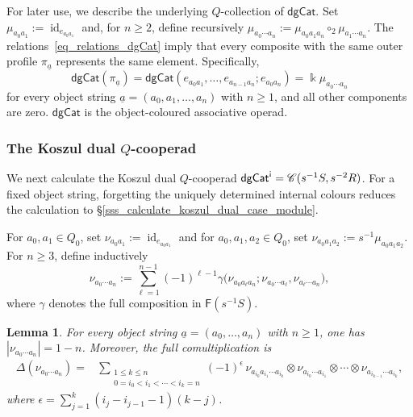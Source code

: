 \documentclass[11pt,letterpaper]{article}
\numberwithin{equation}{section}
\theoremstyle{plain}
\newtheorem{lem}[thm]{Lemma}
\theoremstyle{definition}
\theoremstyle{remark}
\newcommand{\antishriek}{%
	\mathord{\mathchoice
		{\rotatebox[origin=c]{180}{$\displaystyle !$}}
		{\rotatebox[origin=c]{180}{$\textstyle !$}}
		{\rotatebox[origin=c]{180}{$\scriptstyle !$}}
		{\rotatebox[origin=c]{180}{$\scriptscriptstyle !$}}}}
\newcommand{\id}{\operatorname{id}}
\begin{document}
	For later use, we describe the underlying $Q$-collection of
	$\mathsf{dgCat}$. Set
	$\mu_{a_0a_1}:=\id_{e_{a_0a_1}}$
	and, for $n\geq2$, define recursively
	$\mu_{a_0\cdots a_n}:=\mu_{a_0a_1a_n}\circ_2\mu_{a_1\cdots a_n}$.
	The relations~\eqref{eq_relations_dgCat} imply that every composite with the same outer profile $\pi_{\underline a}$ represents the same
	element. Specifically,
	\begin{equation*}
		\mathsf{dgCat}(\pi_{\underline a}) = 	\mathsf{dgCat}(e_{a_0a_1},\dots, e_{a_{n-1}a_n}; e_{a_0a_n})
		=
		\Bbbk\mu_{a_0\cdots a_n}
	\end{equation*}
	for every object string $\underline a=(a_0, a_1,\dots, a_n)$ with $n\geq1$,
	and all other components are zero. $\mathsf{dgCat}$ is the object-coloured associative operad.

	\subsubsection{The Koszul dual $Q$-cooperad}

	We next calculate the Koszul dual $Q$-cooperad
	$\mathsf{dgCat}^{\antishriek} =\mathscr C(s^{-1}S,s^{-2}R)$.
	For a fixed object string, forgetting the uniquely determined internal colours reduces the calculation to \S\ref{sss_calculate_koszul_dual_case_module}.

	For $a_0,a_1\in Q_0$, set
	$\nu_{a_0a_1}:=\id_{e_{a_0a_1}}$ and for $a_0,a_1,a_2\in Q_0$, set $\nu_{a_0a_1a_2}:=s^{-1}\mu_{a_0a_1a_2}$.
	For $n\geq3$, define inductively
	\begin{equation}
		\label{eq_inductive_nu_dgCat}
		\nu_{a_0\cdots a_n}
		:=
		\sum_{\ell=1}^{n-1}
		(-1)^{\ell-1}
		\gamma\bigl(
		\nu_{a_0a_\ell a_n};
		\nu_{a_0\cdots a_\ell},
		\nu_{a_\ell\cdots a_n}
		\bigr),
	\end{equation}
	where $\gamma$ denotes the full composition in
	$\mathsf F(s^{-1}S)$.

	\begin{lem}
		\label{lem_comultiplication_nu_dgCat}
		For every object string $\underline a=(a_0,\ldots,a_n)$ with $n\geq1$, one has
		$|\nu_{a_0\cdots a_n}|=1-n$.
		Moreover, the full comultiplication is
		\begin{equation}
			\label{eq_full_comultiplication_nu_dgCat}
			\begin{aligned}
				\Delta(\nu_{a_0\cdots a_n})
				={}&
				\sum_{\substack{
						1\leq k\leq n\\
						0=i_0<i_1<\cdots<i_k=n
				}}
				(-1)^{\epsilon}
				\,
				\nu_{a_{i_0}a_{i_1}\cdots a_{i_k}}
				\otimes
				\nu_{a_{i_0}\cdots a_{i_1}}
				\otimes\cdots\otimes
				\nu_{a_{i_{k-1}}\cdots a_{i_k}},
			\end{aligned}
		\end{equation}
		where $\epsilon=\sum_{j=1}^{k}(i_j-i_{j-1}-1)(k-j)$.
	\end{lem}
\end{document}
